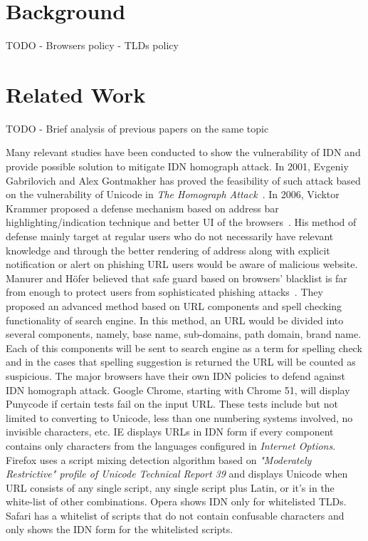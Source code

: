 \documentclass[letterpaper,twocolumn,10pt]{article}
\begin{document}
\section{Background}
TODO
- Browsers policy
- TLDs policy

\section{Related Work}
TODO
- Brief analysis of previous papers on the same topic

Many relevant studies have been conducted to show the vulnerability of IDN and provide possible solution to mitigate IDN homograph attack.
In 2001, Evgeniy Gabrilovich and Alex Gontmakher has proved the feasibility of such attack based on the vulnerability of Unicode in \textit{The Homograph Attack}~\cite{theHomoAttack}.
In 2006, Vicktor Krammer proposed a defense mechanism based on address bar highlighting/indication technique and better UI of the browsers~\cite{phishdefenseKV}.
His method of defense mainly target at regular users who do not necessarily have relevant knowledge and through the better rendering of address along with explicit notification or alert on phishing URL users would be aware of malicious website.
Manurer and Höfer believed that safe guard based on browsers' blacklist is far from enough to protect users from sophisticated phishing attacks~\cite{proc-eds-2012}.
They proposed an advanced method based on URL components and spell checking functionality of search engine.
In this method, an URL would be divided into several components, namely, base name, sub-domains, path domain, brand name.
Each of this components will be sent to search engine as a term for spelling check and in the cases that spelling suggestion is returned the URL will be counted as suspicious.
The major browsers have their own IDN policies to defend against IDN homograph attack.
Google Chrome, starting with Chrome 51, will display Punycode if certain tests fail on the input URL.
These tests include but not limited to converting to Unicode, less than one numbering systems involved, no invisible characters, etc.
IE displays URLs in IDN form if every component contains only characters from the languages configured in \textit{Internet Options}.
Firefox uses a script mixing detection algorithm based on \textit{"Moderately Restrictive" profile of Unicode Technical Report 39} and displays Unicode when URL consists of any single script, any single script plus Latin, or it's in the white-list of other combinations.
Opera shows IDN only for whitelisted TLDs.
Safari has a whitelist of scripts that do not contain confusable characters and only shows the IDN form for the whitelisted scripts.
\end{document}
